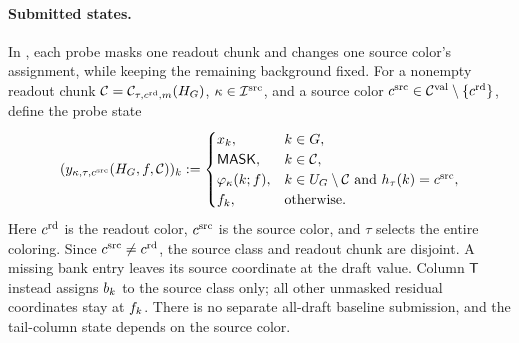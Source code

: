 \paragraph{Submitted states.}
In , each probe masks one readout chunk and changes
one source color's
assignment, while keeping the remaining background fixed.
For a nonempty readout chunk
$\mathcal C=\mathcal C_{\tau,c^{\mathrm{rd}},m}(H_{G})$,
$\kappa\in\mathcal I^{\mathrm{src}}$, and a source color
$c^{\mathrm{src}}\in
\mathcal C^{\mathrm{val}}\setminus\{c^{\mathrm{rd}}\}$, define the probe state
\begin{equation}
 (y_{\kappa,\tau,c^{\mathrm{src}}}(H_{G},f,\mathcal C))_k
 :=\begin{cases}
 x_k,&k\in G,\\
 \mathsf{MASK},&k\in \mathcal C,\\
 \varphi_{\kappa}(k;f),
   &k\in U_{G}\setminus \mathcal C\text{ and }
    h_{\tau}(k)=c^{\mathrm{src}},\\
 f_{k},&\text{otherwise}.
 \end{cases}
 \label{app:eq:screen-probe-state}
\end{equation}
Here $c^{\mathrm{rd}}$ is the readout color,
$c^{\mathrm{src}}$ is the source color, and $\tau$ selects the entire
coloring.  Since $c^{\mathrm{src}}\ne c^{\mathrm{rd}}$, the source class
and readout chunk are
disjoint.  A missing bank entry leaves its source coordinate at the draft
value.  Column $\mathsf T$ instead assigns $b_{k}$ to the
source class only; all other unmasked residual coordinates stay at
$f_{k}$.  There is no separate all-draft baseline submission, and
the tail-column state depends on the source color.


